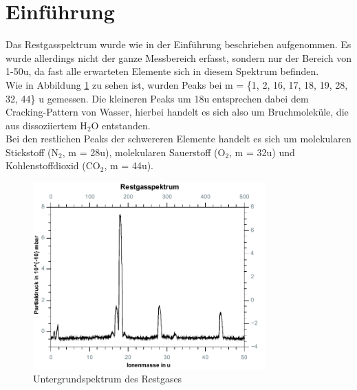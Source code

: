 \section{Einführung}

Das Restgasspektrum wurde wie in der Einführung beschrieben aufgenommen. Es wurde allerdings nicht der ganze Messbereich erfasst, sondern nur der Bereich von 1-50\;u, da fast alle erwarteten Elemente sich in diesem Spektrum befinden.\\
Wie in Abbildung \ref{fig:untergrund_1} zu sehen ist, wurden Peaks bei m = \{1, 2, 16, 17, 18, 19, 28, 32, 44\} u gemessen. Die kleineren Peaks um 18\;u entsprechen dabei dem Cracking-Pattern von Wasser, hierbei handelt es sich also um Bruchmoleküle, die aus dissoziiertem
H$_2$O entstanden.\\
Bei den restlichen Peaks der schwereren Elemente handelt es sich um molekularen Stickstoff (N$_2$, m = 28\;u), molekularen Sauerstoff (O$_2$, m = 32\;u) und Kohlenstoffdioxid (CO$_2$, m = 44\;u).\\

\begin{figure}[h]
	\centering\includegraphics[width=0.8\textwidth]{fig/untergrund_1}
	\caption{Untergrundspektrum des Restgases}
	\label{fig:untergrund_1}
\end{figure}

